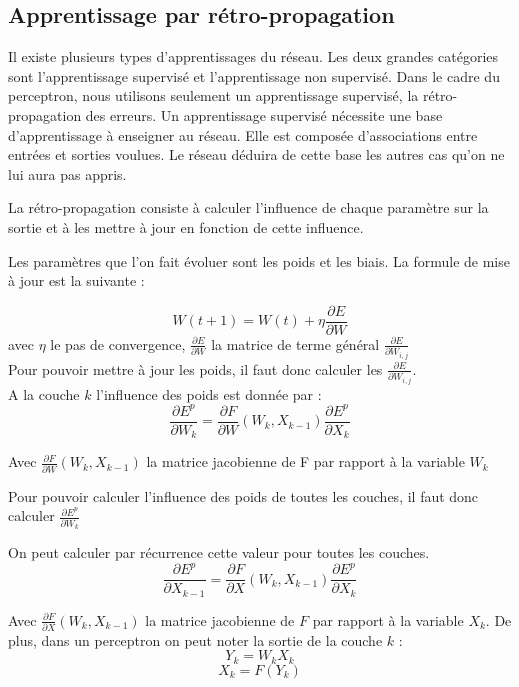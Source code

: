 



\subsection{Apprentissage par rétro-propagation}

Il existe plusieurs types d'apprentissages du réseau. Les deux grandes catégories sont l'apprentissage supervisé et l'apprentissage non supervisé. 
Dans le cadre du perceptron, nous utilisons seulement un apprentissage supervisé, la rétro-propagation des erreurs. Un apprentissage supervisé nécessite une base d'apprentissage à enseigner au réseau. Elle est composée d'associations entre entrées et sorties voulues. Le réseau déduira de cette base les autres cas qu'on ne lui aura pas appris. 

La rétro-propagation consiste à calculer l’influence de chaque paramètre sur la sortie et à les mettre à jour en fonction de cette influence.

Les paramètres que l’on fait évoluer sont les poids et les biais.
La formule de mise à jour est la suivante :

\[
W(t+1) = W(t) + \eta \frac{\partial E}{\partial W} 
\]
avec $\eta$ le pas de convergence, $\frac{\partial E}{\partial W} $ la matrice de terme général $\frac{\partial E}{\partial W_{i,j}} $\\
Pour pouvoir mettre à jour les poids, il faut donc calculer les $\frac{\partial E}{\partial W_{i,j}} $.\\
A la couche $k$ l'influence des poids est donnée par : 
\[
	\frac{\partial E^p}{\partial W _k} = \frac{\partial F}{\partial W}(W_k, X_{k-1})\frac{\partial E^p}{\partial X_k}
\]

Avec $\frac{\partial F}{\partial W}(W_k, X_{k-1})$ la matrice jacobienne de F par rapport à la variable $W_k$

Pour pouvoir calculer l'influence des poids de toutes les couches, il faut donc calculer $\frac{\partial E^p}{\partial W_k}$

On peut calculer par récurrence cette valeur pour toutes les couches.
\[
	\frac{\partial E^p}{\partial X _{k-1}} = \frac{\partial F}{\partial X}(W_k, X_{k-1})\frac{\partial E^p}{\partial X_k}
\]

Avec $\frac{\partial F}{\partial X }(W_k, X_{k-1})$ la matrice jacobienne de $F$ par rapport à la variable $X_k$. De plus, dans un perceptron on peut noter la sortie de la couche $k$ : 
\[
Y_k = W_k X_k \]
\[
X_k = F(Y_k)
\]

